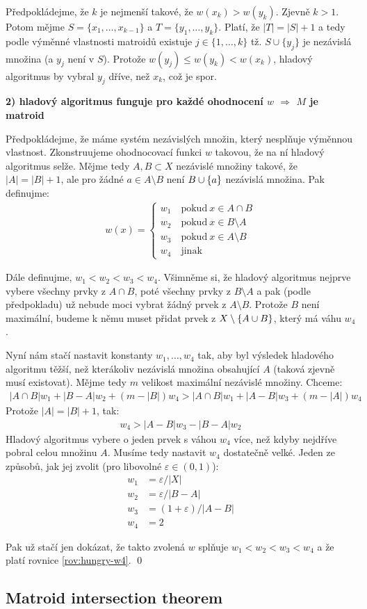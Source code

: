 Předpokládejme, že $k$ je nejmenší takové, že $w(x_k) > w(y_k)$. Zjevně $k > 1$.
Potom mějme $S = \{x_1,\dots,x_{k-1}\}$ a $T = \{y_1,\dots,y_k\}$. Platí, že
$|T| = |S|+1$ a tedy podle výměnné vlastnosti matroidů existuje $j \in
\{1,\dots,k\}$ tž. $S\cup \{y_j\}$ je nezávislá množina (a $y_j$ není v $S$).
Protože $w(y_j) \le w(y_k) < w(x_k)$, hladový algoritmus by vybral $y_j$ dříve,
než $x_k$, což je spor.

\noindent \textbf{2) hladový algoritmus funguje pro každé ohodnocení $w$
$\Rightarrow$ $M$ je matroid}

Předpokládejme, že máme systém nezávislých množin, který nesplňuje výměnnou
vlastnost. Zkonstruujeme ohodnocovací funkci $w$ takovou, že na ní hladový
algoritmus selže. Mějme tedy $A,B \subset X$ nezávislé množiny takové, že $|A| =
|B| + 1$, ale pro žádné $a \in A\setminus B$ není $B\cup \{a\}$ nezávislá
množina. Pak definujme:
\begin{align*}
w(x) = \left\{
	\begin{array}{lr}
		w_1\quad\text{pokud}~x \in A\cap B \\
		w_2\quad\text{pokud}~x \in B \setminus A \\
		w_3\quad\text{pokud}~x \in A \setminus B \\
		w_4\quad\text{jinak}
	\end{array}
	\right.
\end{align*}

Dále definujme, $w_1 < w_2 < w_3 < w_4$. Všimněme si, že hladový algoritmus
nejprve vybere všechny prvky z $A\cap B$, poté všechny prvky z $B\setminus A$ a
pak (podle předpokladu) už nebude moci vybrat žádný prvek z $A\setminus B$.
Protože $B$ není maximální, budeme k němu muset přidat prvek z
$X\setminus\{A\cup B\}$, který má váhu $w_4$.

Nyní nám stačí nastavit konstanty $w_1,\dots,w_4$ tak, aby byl výsledek
hladového algoritmu těžší, než kterákoliv nezávislá množina obsahující $A$
(taková zjevně musí existovat). Mějme tedy $m$ velikost maximální nezávislé
množiny. Chceme:
\begin{align*}
|A\cap B|w_1 + |B-A|w_2 + (m-|B|)w_4 > |A\cap B|w_1 + |A-B|w_3 + (m-|A|)w_4
\end{align*}
Protože $|A| = |B|+1$, tak:
\begin{align}
\label{rov:hungry-w4}
w_4 > |A-B|w_3 - |B-A|w_2
\end{align}
Hladový algoritmus vybere o jeden prvek s váhou $w_4$ více, než kdyby nejdříve
pobral celou množinu $A$. Musíme tedy nastavit $w_4$ dostatečně velké. Jeden ze
způsobů, jak jej zvolit (pro libovolné $\varepsilon\in (0,1)$):
\begin{align*}
w_1 &= \varepsilon /|X| \\
w_2 &= \varepsilon /|B-A| \\
w_3 &= (1+\varepsilon) /|A-B| \\
w_4 &= 2
\end{align*}

Pak už stačí jen dokázat, že takto zvolená $w$ splňuje $w_1 < w_2 < w_3 < w_4$ a
že platí rovnice \ref{rov:hungry-w4}.
\qed

\subsection{Matroid intersection theorem}
\todo


